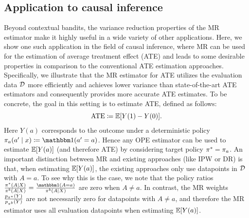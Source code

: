 \subsection{Application to causal inference}\label{subsec:application-to-causal-inference}
 Beyond contextual bandits, the variance reduction properties of the MR estimator make it highly useful in a wide variety of other applications. Here, we show one such application in the field of causal inference, where MR can be used for the estimation of average treatment effect (ATE) \citep{pearl2009causality} and leads to some desirable properties in comparison to the conventional ATE estimation approaches. Specifically, we illustrate that the MR estimator for ATE utilizes the evaluation data $\mathcal{D}$ more efficiently and achieves lower variance than state-of-the-art ATE estimators and consequently provides more accurate ATE estimates.
To be concrete, the goal in this setting is to estimate ATE, defined as follows:
\[
\textup{ATE} \coloneqq \mathbb{E}[Y(1)-Y(0)].
\]
Here $Y(a)$ corresponds to the outcome under a deterministic policy $\pi_a(a'\mid x) \coloneqq \ind(a'=a)$. Hence any OPE estimator can be used to estimate $\mathbb{E}[Y(a)]$ (and therefore ATE) by considering target policy $\pi^* = \pi_a$.
An important distinction between MR and existing approaches (like IPW or DR) is that, when estimating $\mathbb{E}[Y(a)]$, the existing approaches only use datapoints in $\mathcal{D}$ with $A=a$. To see why this is the case, we note that the policy ratios $\frac{\tar(A|X)}{\beh(A|X)} = \frac{\ind(A=a)}{\beh(A|X)}$ are zero when $A\neq a$. In contrast, the MR weights $\frac{p_{\pi^*}(Y)}{p_{\pi^b}(Y)}$ are not necessarily zero for datapoints with $A\neq a$, and therefore the MR estimator uses all evaluation datapoints when estimating $\mathbb{E}[Y(a)]$. 

